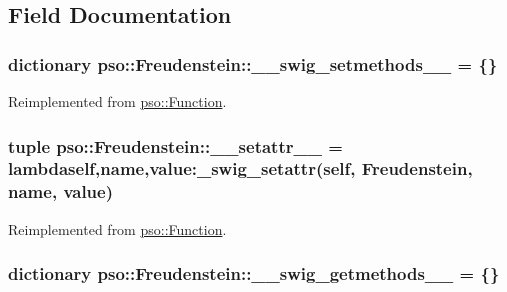 \subsection{Field Documentation}
\hypertarget{classpso_1_1Freudenstein_d9e773221878926aafbb38d695a4017e}{
\subsubsection{\setlength{\rightskip}{0pt plus 5cm}dictionary {\bf pso::Freudenstein::\_\-\_\-swig\_\-setmethods\_\-\_\-} = \{\}}}
\label{classpso_1_1Freudenstein_d9e773221878926aafbb38d695a4017e}




Reimplemented from \hyperlink{classpso_1_1Function_2334bfe507115d58047f67960dde71d3}{pso::Function}.\hypertarget{classpso_1_1Freudenstein_13d26a6411b620f14698a539a7321080}{
\subsubsection{\setlength{\rightskip}{0pt plus 5cm}tuple {\bf pso::Freudenstein::\_\-\_\-setattr\_\-\_\-} = lambdaself,name,value:\_\-swig\_\-setattr(self, {\bf Freudenstein}, name, value)}}
\label{classpso_1_1Freudenstein_13d26a6411b620f14698a539a7321080}




Reimplemented from \hyperlink{classpso_1_1Function_cd8775cf6aadc3fdf4e6d82158ef10fb}{pso::Function}.\hypertarget{classpso_1_1Freudenstein_5e01e784238005f1fe1d4befa249be0f}{
\subsubsection{\setlength{\rightskip}{0pt plus 5cm}dictionary {\bf pso::Freudenstein::\_\-\_\-swig\_\-getmethods\_\-\_\-} = \{\}}}
\label{classpso_1_1Freudenstein_5e01e784238005f1fe1d4befa249be0f}




